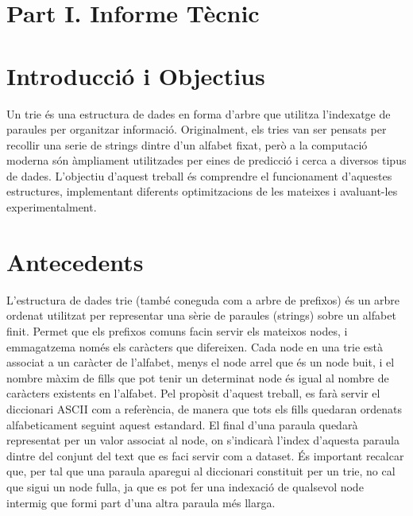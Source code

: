 \section*{\centering Part I. Informe Tècnic}

\section{Introducció i Objectius}

Un trie és una estructura de dades en forma d'arbre que utilitza l'indexatge de paraules per organitzar informació. Originalment, els tries van ser pensats per recollir una serie de strings dintre d'un alfabet fixat, però a la computació moderna són àmpliament utilitzades per eines de predicció i cerca a diversos tipus de dades. L'objectiu d'aquest treball és comprendre el funcionament d'aquestes estructures, implementant diferents optimitzacions de les mateixes i avaluant-les experimentalment. 

\section{Antecedents}

L'estructura de dades trie (també coneguda com a arbre de prefixos) és un arbre ordenat utilitzat per representar una sèrie de paraules (strings) sobre un alfabet finit. Permet que els prefixos comuns facin servir els mateixos nodes, i emmagatzema només els caràcters que difereixen. 
Cada node en una trie està associat a un caràcter de l'alfabet, menys el node arrel que és un node buit, i el nombre màxim de fills que pot tenir un determinat node és igual al nombre de caràcters existents en l'alfabet. Pel propòsit d'aquest treball, es farà servir el diccionari ASCII com a referència, de manera que tots els fills quedaran ordenats alfabeticament seguint aquest estandard. El final d'una paraula quedarà representat per un valor associat al node, on s'indicarà l'index d'aquesta paraula dintre del conjunt del text que es faci servir com a dataset. És important recalcar que, per tal que una paraula aparegui al diccionari constituit per un trie, no cal que sigui un node fulla, ja que es pot fer una indexació de qualsevol node intermig que formi part d'una altra paraula més llarga. 

